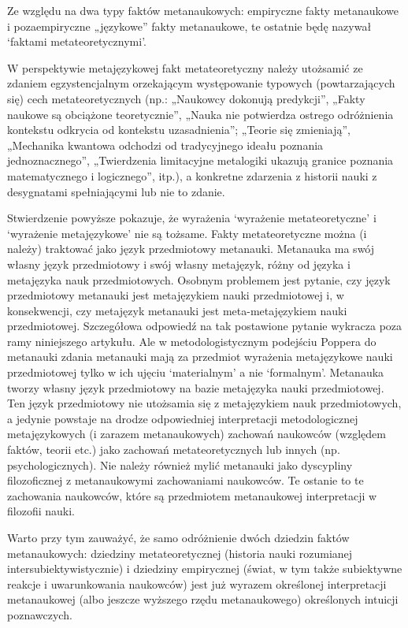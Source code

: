 \documentclass{article}
\begin{document}
Ze względu na dwa typy faktów metanaukowych: empiryczne fakty metanaukowe i pozaempiryczne „językowe” fakty metanaukowe,
te ostatnie będę nazywał ‘faktami metateoretycznymi’.

W perspektywie metajęzykowej fakt metateoretyczny należy utożsamić ze zdaniem egzystencjalnym orzekającym występowanie
typowych (powtarzających się) cech metateoretycznych (np.: „Naukowcy dokonują predykcji”, „Fakty naukowe są obciążone
teoretycznie”, „Nauka nie potwierdza ostrego odróżnienia kontekstu odkrycia od kontekstu uzasadnienia”; „Teorie się
zmieniają”, „Mechanika kwantowa odchodzi od tradycyjnego ideału poznania jednoznacznego”, „Twierdzenia limitacyjne
metalogiki ukazują granice poznania matematycznego i logicznego”, itp.), a konkretne zdarzenia z historii nauki z
desygnatami spełniającymi lub nie to zdanie. 

Stwierdzenie powyższe pokazuje, że wyrażenia ‘wyrażenie metateoretyczne’ i ‘wyrażenie metajęzykowe’ nie są tożsame.
Fakty metateoretyczne można (i należy) traktować jako język przedmiotowy metanauki. Metanauka ma swój własny język
przedmiotowy i swój własny metajęzyk, różny od języka i metajęzyka nauk przedmiotowych. Osobnym problemem jest pytanie,
czy język przedmiotowy metanauki jest metajęzykiem nauki przedmiotowej i, w konsekwencji, czy metajęzyk metanauki jest
meta-metajęzykiem nauki przedmiotowej. Szczegółowa odpowiedź na tak postawione pytanie wykracza poza ramy niniejszego
artykułu. Ale w metodologistycznym podejściu Poppera do metanauki zdania metanauki mają za przedmiot wyrażenia
metajęzykowe nauki przedmiotowej tylko w ich ujęciu ‘materialnym’ a nie ‘formalnym’. Metanauka tworzy własny język
przedmiotowy na bazie metajęzyka nauki przedmiotowej. Ten język przedmiotowy nie utożsamia się z metajęzykiem nauk
przedmiotowych, a jedynie powstaje na drodze odpowiedniej interpretacji metodologicznej metajęzykowych (i zarazem
metanaukowych) zachowań naukowców (względem faktów, teorii etc.) jako zachowań metateoretycznych lub innych (np.
psychologicznych). Nie należy również mylić metanauki jako dyscypliny filozoficznej z metanaukowymi zachowaniami
naukowców. Te ostanie to te zachowania naukowców, które są przedmiotem metanaukowej interpretacji w filozofii nauki.

Warto przy tym zauważyć, że samo odróżnienie dwóch dziedzin faktów metanaukowych: dziedziny metateoretycznej (historia
nauki rozumianej intersubiektywistycznie) i dziedziny empirycznej (świat, w tym także subiektywne reakcje i
uwarunkowania naukowców) jest już wyrazem określonej interpretacji metanaukowej (albo jeszcze wyższego rzędu
metanaukowego) określonych intuicji poznawczych.
\end{document}

